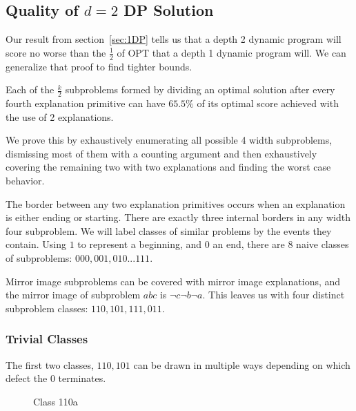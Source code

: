 \subsection{Quality of $d=2$ DP Solution}

Our result from section~\ref{sec:1DP} tells us that a depth 2 dynamic program will score no worse than the $\frac12$ of OPT that a depth 1 dynamic program will.  We can generalize that proof to find tighter bounds.

\begin{lem} \label{lem:2DP2/3}
Each of the $\frac{k}{2}$ subproblems formed by dividing an optimal solution after every fourth explanation primitive can have $65.5\%$ of its optimal score achieved with the use of 2 explanations.
\end{lem}

We prove this by exhaustively enumerating all possible 4 width subproblems, dismissing most of them with a counting argument and then exhaustively covering the remaining two with two explanations and finding the worst case behavior.

The border between any two explanation primitives occurs when an explanation is either ending or starting.  There are exactly three internal borders in any width four subproblem.  We will label classes of similar problems by the events they contain.  Using $1$ to represent a beginning, and $0$ an end, there are 8 naive classes of subproblems: $000, 001, 010 ... 111$.

Mirror image subproblems can be covered with mirror image explanations, and the mirror image of subproblem $abc$ is $\neg c \neg b \neg a$.  This leaves us with four distinct subproblem classes: $110, 101, 111, 011$. 

\subsubsection{Trivial Classes}

The first two classes, $110, 101$ can be drawn in multiple ways depending on which defect the $0$ terminates.  

\begin{figure}[h] \centering 
{} 
\caption{Class 110a}
\end{figure}


